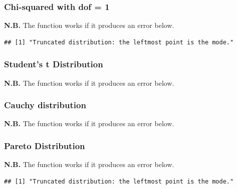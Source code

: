 \documentclass{article}\usepackage[]{graphicx}\usepackage[]{color}
\makeatletter
\newenvironment{kframe}{%
 \def\at@end@of@kframe{}%
 \ifinner\ifhmode%
  \def\at@end@of@kframe{\end{minipage}}%
  \begin{minipage}{\columnwidth}%
 \fi\fi%
 \def\FrameCommand##1{\hskip\@totalleftmargin \hskip-\fboxsep
 \colorbox{shadecolor}{##1}\hskip-\fboxsep
     \hskip-\linewidth \hskip-\@totalleftmargin \hskip\columnwidth}%
 \MakeFramed {\advance\hsize-\width
   \@totalleftmargin\z@ \linewidth\hsize
   \@setminipage}}%
 {\par\unskip\endMakeFramed%
 \at@end@of@kframe}
\newenvironment{knitrout}{}{} %
\makeatother
\begin{document}
\subsubsection{Chi-squared with dof = 1}
\textbf{N.B.} The function works if it produces an error below.
\begin{knitrout}
\color{fgcolor}\begin{kframe}
\begin{verbatim}
## [1] "Truncated distribution: the leftmost point is the mode."
\end{verbatim}


{\ttfamily\noindent\bfseries\color{errorcolor}{\#\# Error in ars(chisq\_pdf, n, 0.001, Inf): Bad density: not log-concave}}\end{kframe}
\end{knitrout}
\subsubsection{Student's t Distribution}
\textbf{N.B.} The function works if it produces an error below.
\begin{knitrout}
\color{fgcolor}\begin{kframe}


{\ttfamily\noindent\bfseries\color{errorcolor}{\#\# Error in ars(t\_pdf, n, -50, 50): Bad density: not log-concave}}\end{kframe}
\end{knitrout}
\subsubsection{Cauchy distribution}
\textbf{N.B.} The function works if it produces an error below.
\begin{knitrout}
\color{fgcolor}\begin{kframe}


{\ttfamily\noindent\bfseries\color{errorcolor}{\#\# Error in ars(cauchy\_pdf, n, -Inf, Inf): Bad density: not log-concave}}\end{kframe}
\end{knitrout}
\subsubsection{Pareto Distribution}
\textbf{N.B.} The function works if it produces an error below.
\begin{knitrout}
\color{fgcolor}\begin{kframe}
\begin{verbatim}
## [1] "Truncated distribution: the leftmost point is the mode."
\end{verbatim}


{\ttfamily\noindent\bfseries\color{errorcolor}{\#\# Error in ars(pareto\_pdf, n, 3, Inf): Bad density: not log-concave}}\end{kframe}
\end{knitrout}
\end{document}
